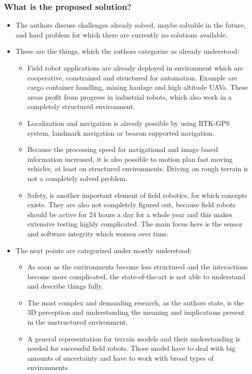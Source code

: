     \subsubsection*{What is the proposed solution?}
    \begin{itemize}
        \item The authors discuss challenges already solved, maybe solvable in the future, and hard problem for which there are currently no solutions available. 
        \item These are the things, which the authors categorize as already understood: \ \begin{itemize}
            \item Field robot applications are already deployed in environment which are cooperative, constrained and structured for automation. Example are cargo container handling, mining haulage and high altitude UAVs. These areas profit from progress in industrial robots, which also work in a completely structured environment.
            \item Localization and navigation is already possible by using RTK-GPS system, landmark navigation or beacon supported navigation.
            \item Because the processing speed for navigational and image based information increased, it is also possible to motion plan fast moving vehicles, at least on structured environments. Driving on rough terrain is not a completely solved problem.
            \item Safety, is another important element of field robotics, for which concepts exists. They are also not completely figured out, because field robots should be active for 24 hours a day for a whole year and this makes extensive testing highly complicated. The main focus here is the sensor and software integrity which worsen over time.
        \end{itemize}
        \item The next points are categorized under mostly understood: \ \begin{itemize}
            \item As soon as the environments become less structured and the interactions become more complicated, the state-of-the-art is not able to understand and describe things fully.
            \item The most complex and demanding research, as the authors state, is the 3D perception and understanding the meaning and implications present in the unstructured environment.
            \item A general representation for terrain models and their understanding is needed for successful field robots. Those model have to deal with big amounts of uncertainty and have to work with broad types of environments.

\end{itemize}
\end{itemize}
